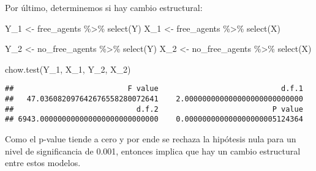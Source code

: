 \documentclass[
]{article}
\newenvironment{Shaded}{\begin{snugshade}}{\end{snugshade}}
\newcommand{\FunctionTok}[1]{\textcolor[rgb]{0.00,0.00,0.00}{#1}}
\newcommand{\NormalTok}[1]{#1}
\newcommand{\OtherTok}[1]{\textcolor[rgb]{0.56,0.35,0.01}{#1}}
\newcommand{\SpecialCharTok}[1]{\textcolor[rgb]{0.00,0.00,0.00}{#1}}
\begin{document}
Por último, determinemos si hay cambio estructural:

\begin{Shaded}
\begin{Highlighting}[]
\NormalTok{Y\_1 }\OtherTok{\textless{}{-}}\NormalTok{ free\_agents }\SpecialCharTok{\%\textgreater{}\%} \FunctionTok{select}\NormalTok{(Y)}
\NormalTok{X\_1 }\OtherTok{\textless{}{-}}\NormalTok{ free\_agents }\SpecialCharTok{\%\textgreater{}\%} \FunctionTok{select}\NormalTok{(X)}

\NormalTok{Y\_2 }\OtherTok{\textless{}{-}}\NormalTok{ no\_free\_agents }\SpecialCharTok{\%\textgreater{}\%} \FunctionTok{select}\NormalTok{(Y)}
\NormalTok{X\_2 }\OtherTok{\textless{}{-}}\NormalTok{ no\_free\_agents }\SpecialCharTok{\%\textgreater{}\%} \FunctionTok{select}\NormalTok{(X)}

\FunctionTok{chow.test}\NormalTok{(Y\_1, X\_1, Y\_2, X\_2)}
\end{Highlighting}
\end{Shaded}

\begin{verbatim}
##                          F value                            d.f.1 
##   47.036082097642676558280072641    2.000000000000000000000000000 
##                            d.f.2                          P value 
## 6943.000000000000000000000000000    0.000000000000000000005124364
\end{verbatim}

Como el p-value tiende a cero y por ende se rechaza la hipótesis nula
para un nivel de significancia de 0.001, entonces implica que hay un
cambio estructural entre estos modelos.
\end{document}
